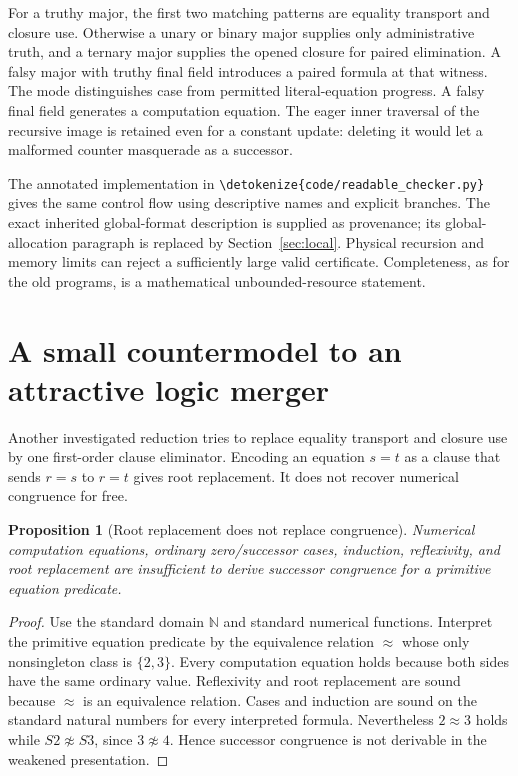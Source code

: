 \documentclass[11pt,letterpaper]{article}
\newtheorem{proposition}[theorem]{Proposition}
\theoremstyle{definition}\newtheorem{definition}[theorem]{Definition}
\theoremstyle{remark}\newtheorem{remark}[theorem]{Remark}
\newcommand{\file}[1]{\expandafter\nolinkurl\expandafter{\detokenize{#1}}}
\begin{document}
For a truthy major, the first two matching patterns are equality
transport and closure use. Otherwise a unary or binary major supplies
only administrative truth, and a ternary major supplies the opened
closure for paired elimination. A falsy major with truthy final field
introduces a paired formula at that witness. The mode distinguishes
case from permitted literal-equation progress. A falsy final field
generates a computation equation. The eager inner traversal of the
recursive image is retained even for a constant update: deleting it
would let a malformed counter masquerade as a successor.

The annotated implementation in \file{code/readable_checker.py} gives
the same control flow using descriptive names and explicit branches.
The exact inherited global-format description is supplied as provenance;
its global-allocation paragraph is replaced by Section~\ref{sec:local}.
Physical recursion and memory limits can reject a sufficiently large
valid certificate. Completeness, as for the old programs, is a
mathematical unbounded-resource statement.






\section{A small countermodel to an attractive logic merger}
\label{sec:congruence-obstruction}

Another investigated reduction tries to replace equality transport
and closure use by one first-order clause eliminator. Encoding an
equation $s=t$ as a clause that sends $r=s$ to $r=t$ gives root
replacement. It does not recover numerical congruence for free.

\begin{proposition}[Root replacement does not replace congruence]
Numerical computation equations, ordinary zero/successor cases,
induction, reflexivity, and root replacement are insufficient to
derive successor congruence for a primitive equation predicate.
\end{proposition}
\begin{proof}
Use the standard domain $\mathbb N$ and standard numerical functions.
Interpret the primitive equation predicate by the equivalence relation
$\approx$ whose only nonsingleton class is $\{2,3\}$. Every
computation equation holds because both sides have the same ordinary
value. Reflexivity and root replacement are sound because
$\approx$ is an equivalence relation. Cases and induction are sound
on the standard natural numbers for every interpreted formula.
Nevertheless $2\approx3$ holds while $S2\not\approx S3$, since
$3\not\approx4$. Hence successor congruence is not derivable in
the weakened presentation.
\end{proof}
\end{document}
